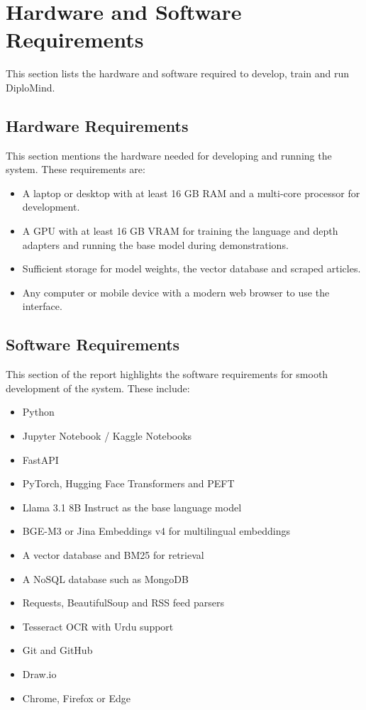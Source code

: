 \documentclass{FastFyp}
\begin{document}
\section{Hardware and Software Requirements}
This section lists the hardware and software required to develop, train and run DiploMind.
\subsection{Hardware Requirements}
This section mentions the hardware needed for developing and running the system. These requirements are:
\begin{itemize}
    \item A laptop or desktop with at least 16 GB RAM and a multi-core processor for development.
    \item A GPU with at least 16 GB VRAM for training the language and depth adapters and running the base model during demonstrations.
    \item Sufficient storage for model weights, the vector database and scraped articles.
    \item Any computer or mobile device with a modern web browser to use the interface.
\end{itemize}

\subsection{Software Requirements}
This section of the report highlights the software requirements for smooth development of the system. These include:
\begin{itemize}
    \item Python
    \item Jupyter Notebook / Kaggle Notebooks
    \item FastAPI
    \item PyTorch, Hugging Face Transformers and PEFT
   \item Llama 3.1 8B Instruct as the base language model
    \item BGE-M3 or Jina Embeddings v4 for multilingual embeddings
    \item A vector database and BM25 for retrieval
    \item A NoSQL database such as MongoDB
    \item Requests, BeautifulSoup and RSS feed parsers
    \item Tesseract OCR with Urdu support
    \item Git and GitHub
    \item Draw.io
    \item Chrome, Firefox or Edge
\end{itemize}
\end{document}
